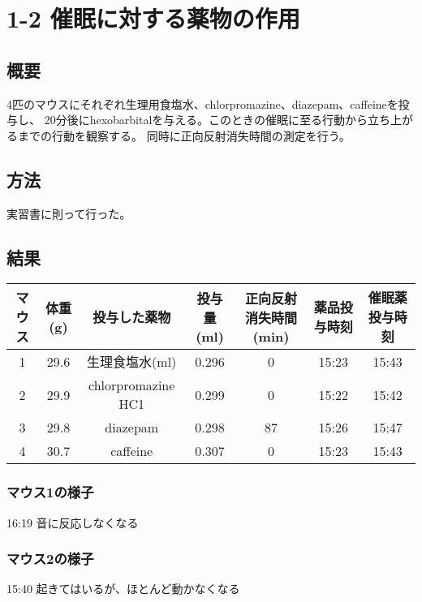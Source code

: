 \documentclass[a4paper,papersize,dvipdfmx]{jsarticle}
\begin{document}
\section*{1-2 催眠に対する薬物の作用}

\subsection*{概要}
4匹のマウスにそれぞれ生理用食塩水、chlorpromazine、diazepam、caffeineを投与し、
20分後にhexobarbitalを与える。このときの催眠に至る行動から立ち上がるまでの行動を観察する。
同時に正向反射消失時間の測定を行う。

\subsection*{方法}
実習書に則って行った。

\subsection*{結果}


\begin{table}[H]
\centering
\begin{tabular}{|c|c|c|c|c|c|c|}
\hline
マウス & 体重(g) & 投与した薬物             & 投与量(ml) & 正向反射消失時間(min) & 薬品投与時刻 & 催眠薬投与時刻 \\ \hline
1 & 29.6  & 生理食塩水(ml)          & 0.296   & 0             & 15:23  & 15:43   \\ \hline
2 & 29.9  & chlorpromazine HC1 & 0.299   & 0             & 15:22  & 15:42   \\ \hline
3 & 29.8  & diazepam           & 0.298   & 87            & 15:26  & 15:47   \\ \hline
4 & 30.7  & caffeine           & 0.307   & 0             & 15:23  & 15:43   \\ \hline
\end{tabular}
\end{table}

\subsubsection*{マウス1の様子}
16:19 音に反応しなくなる

\subsubsection*{マウス2の様子}
15:40 起きてはいるが、ほとんど動かなくなる
\end{document}
